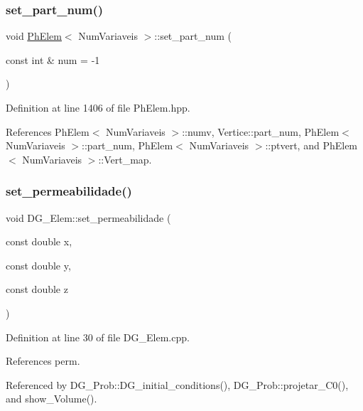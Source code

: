 \subsubsection{\texorpdfstring{set\+\_\+part\+\_\+num()}{set\_part\_num()}}
{\footnotesize\ttfamily void \hyperlink{classPhElem}{Ph\+Elem}$<$ Num\+Variaveis $>$\+::set\+\_\+part\+\_\+num (\begin{DoxyParamCaption}\item[{const int \&}]{num = {\ttfamily -\/1} }\end{DoxyParamCaption})\hspace{0.3cm}{\ttfamily [inherited]}}



Definition at line 1406 of file Ph\+Elem.\+hpp.



References Ph\+Elem$<$ Num\+Variaveis $>$\+::numv, Vertice\+::part\+\_\+num, Ph\+Elem$<$ Num\+Variaveis $>$\+::part\+\_\+num, Ph\+Elem$<$ Num\+Variaveis $>$\+::ptvert, and Ph\+Elem$<$ Num\+Variaveis $>$\+::\+Vert\+\_\+map.

\mbox{\label{classDG__Elem_a51393e54786059782e6a0502f00cdd50}} 
\subsubsection{\texorpdfstring{set\+\_\+permeabilidade()}{set\_permeabilidade()}}
{\footnotesize\ttfamily void D\+G\+\_\+\+Elem\+::set\+\_\+permeabilidade (\begin{DoxyParamCaption}\item[{const double}]{x,  }\item[{const double}]{y,  }\item[{const double}]{z }\end{DoxyParamCaption})}



Definition at line 30 of file D\+G\+\_\+\+Elem.\+cpp.



References perm.



Referenced by D\+G\+\_\+\+Prob\+::\+D\+G\+\_\+initial\+\_\+conditions(), D\+G\+\_\+\+Prob\+::projetar\+\_\+\+C0(), and show\+\_\+\+Volume().

